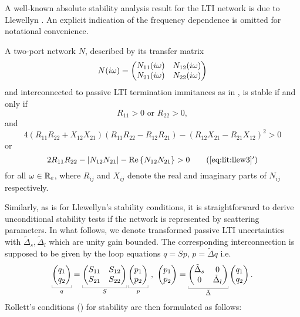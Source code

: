 A well-known absolute stability analysis result for the LTI network is due to Llewellyn \cite{llewellyn}. 
An explicit indication of the frequency dependence is omitted for notational convenience.
\begin{thm}\label{thm:apdx:llw}
A two-port network $N$,  described by its transfer matrix
\[
N(i\omega) = \begin{pmatrix}N_{11}(i\omega) &N_{12}(i\omega)\\N_{21}(i\omega) &N_{22}(i\omega)\end{pmatrix}
\]
and interconnected to passive LTI termination immitances as in , is stable if and only if
\begin{equation}R_{11} > 0\text{ or } R_{22} > 0,\label{eq:lit:llew2}\end{equation} and
\begin{equation}4\left(R_{11}R_{22}+X_{12}X_{21}\right)\left(R_{11}R_{22}-R_{12}R_{21}\right)-\left(R_{12}X_{21}-R_{21}X_{12}\right)^2 > 0\label{eq:lit:llew3}\end{equation} 
or
\begin{equation}2R_{11}R_{22}-\abs{N_{12}N_{21}}-\Re{N_{12}N_{21}} > 0\tag{\ref{eq:lit:llew3}$'$}\label{eq:lit:llew3p}\end{equation}
for all $\omega\in\mathbb{R}_e$, where $R_{ij}$ and $X_{ij}$ denote the real and imaginary parts of $N_{ij}$ respectively.
\end{thm}

Similarly, as is for Llewellyn's stability conditions, it is straightforward to derive 
unconditional stability {tests if} the network is represented by scattering parameters. 
In what follows, we denote transformed passive LTI uncertainties with $\tilde{\Delta}_{s}, 
\tilde{\Delta}_l$ which are unity gain bounded. The corresponding interconnection is 
supposed to be given by the loop equations
$q = S p$, $p=\tilde{\Delta} q$ i.e.
\begin{equation}
\underbracket[0.2pt]{\pmatr{q_1\\q_2}}_{q}=
\underbracket[0.2pt]{\pmatr{S_{11} &S_{12}\\S_{21} &S_{22}}}_{S}
\underbracket[0.2pt]{\pmatr{p_1\\p_2}}_{p} \ , \ \pmatr{p_1\\p_2}=
\underbracket[0.2pt]{\pmatr{\tilde{\Delta}_s&0\\0&\tilde{\Delta}_l}}_{\tilde{\Delta}} \pmatr{q_1\\q_2}.
\label{eq:rolic}
\end{equation}
Rollett's conditions (\cite{stern,rollett,kurokawa}) for stability are then
formulated as follows: 

